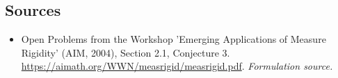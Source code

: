 \documentclass[11pt]{article}
\begin{document}
\subsection{Sources}
\begin{itemize}
\item[S1]Open Problems from the Workshop 'Emerging Applications of Measure Rigidity' (AIM, 2004), Section 2.1, Conjecture 3.
\url{https://aimath.org/WWN/measrigid/measrigid.pdf}.
\textit{Formulation source.}
\end{itemize}
\end{document}
